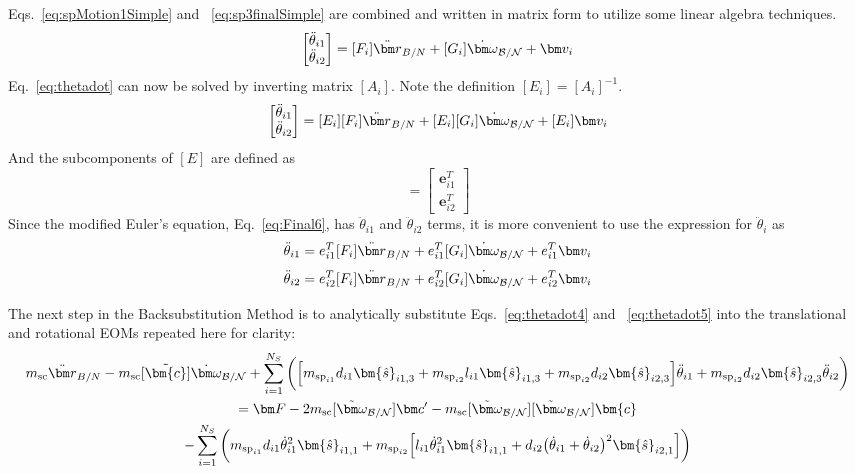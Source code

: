 Eqs.~\eqref{eq:spMotion1Simple} and ~\eqref{eq:sp3finalSimple} are combined and written in matrix form to utilize some linear algebra techniques.
\begin{equation}
	[A_i]\begin{bmatrix}
		\ddot \theta_{i1}\\
		\ddot \theta_{i2}
	\end{bmatrix}
	= [F_i] \ddot{\bm r}_{B/N} + [G_i]\dot{\bm\omega}_{\cal B/N} + \bm v_i
	\label{eq:thetadot}
\end{equation}
Eq.~\eqref{eq:thetadot} can now be solved by inverting matrix $[A_i]$. Note the definition $[E_i] = [A_i]^{-1}$.
\begin{equation}
	\begin{bmatrix}
		\ddot \theta_{i1}\\
		\ddot \theta_{i2}
	\end{bmatrix}
	= [E_i][F_i] \ddot{\bm r}_{B/N} + [E_i][G_i]\dot{\bm\omega}_{\cal B/N} + [E_i]\bm v_i
	\label{eq:thetadot2}
\end{equation}
And the subcomponents of $[E]$ are defined as
\begin{equation}
	[E] = \begin{bmatrix}
		\bm e_{i1}^T\\
		\bm e_{i2}^T
	\end{bmatrix}
	\label{eq:E}
\end{equation}
Since the modified Euler's equation, Eq.~\eqref{eq:Final6}, has $\ddot \theta_{i1}$ and $\ddot \theta_{i2}$ terms, it is more convenient to use the expression for $\ddot \theta_i$ as
\begin{equation}
	\ddot \theta_{i1}
	= e_{i1}^T[F_i] \ddot{\bm r}_{B/N} + e_{i1}^T[G_i]\dot{\bm\omega}_{\cal B/N} + e_{i1}^T\bm v_i
	\label{eq:thetadot4}
\end{equation}
\begin{equation}
	\ddot \theta_{i2}
	= e_{i2}^T[F_i] \ddot{\bm r}_{B/N} + e_{i2}^T[G_i]\dot{\bm\omega}_{\cal B/N} + e_{i2}^T\bm v_i
	\label{eq:thetadot5}
\end{equation}


The next step in the Backsubstitution Method is to analytically substitute Eqs.~\eqref{eq:thetadot4} and ~\eqref{eq:thetadot5} into the translational and rotational EOMs repeated here for clarity:
\begin{multline}
	m_\text{sc} \ddot{\bm r}_{B/N} -m_\text{sc} [\tilde{\bm{c}}] \dot{\bm\omega}_{\cal B/N} +  \sum_{i=1}^{N_{S}}\bigg(\Big[m_{\text{sp}_{i1}}d_{i1} \bm{\hat{s}}_{i1,3} +m_{\text{sp}_{i2}}l_{i1} \bm{\hat{s}}_{i1,3}+m_{\text{sp}_{i2}} d_{i2}\bm{\hat{s}}_{i2,3}\Big]\ddot{\theta}_{i1} +m_{\text{sp}_{i2}} d_{i2} \bm{\hat{s}}_{i2,3}\ddot{\theta}_{i2}\bigg) \\
	= \bm F - 2m_\text{sc} [\tilde{\bm\omega}_{\cal B/N}] \bm c'- m_\text{sc} [\tilde{\bm\omega}_{\cal B/N}][\tilde{\bm\omega}_{\cal B/N}]\bm{c}\\
	-\sum_{i=1}^{N_{S}}\bigg(m_{\text{sp}_{i1}}d_{i1} \dot{\theta}_{i1}^2 \bm{\hat{s}}_{i1,1} +m_{\text{sp}_{i2}}\Big[l_{i1} \dot{\theta}_{i1}^2 \bm{\hat{s}}_{i1,1} + d_{i2}\big(\dot{\theta}_{i1} + \dot{\theta}_{i2}\big)^2\bm{\hat{s}}_{i2,1}\Big]\bigg)
	\label{eq:Rbddot4}
\end{multline}

